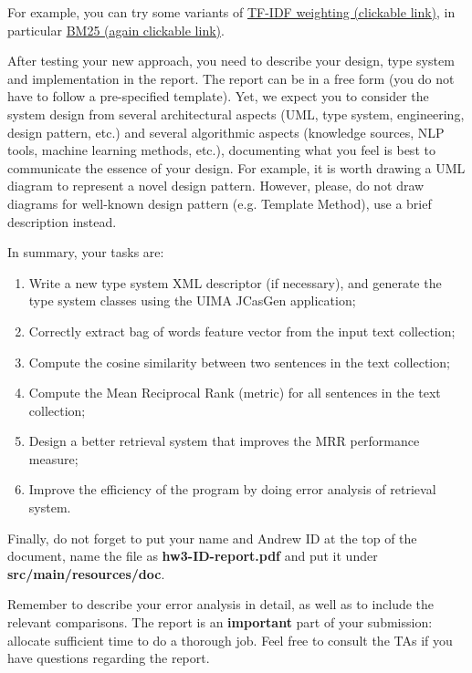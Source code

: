 \documentclass[oneside,11pt]{memoir}
\begin{document}
For example, you can try some variants of \href{http://nlp.stanford.edu/IR-book/html/htmledition/tf-idf-weighting-1.html}{TF-IDF weighting (clickable link)}, in particular \href{http://en.wikipedia.org/wiki/Okapi_BM25}{BM25 (again clickable link)}.

After testing your new approach,
you need to describe your design, type system and implementation in the report.
The report can be in a free form (you do not have to follow a pre-specified template).
Yet, we expect you to consider the system design from several architectural aspects (UML, type
system, engineering, design pattern, etc.) and several algorithmic aspects (knowledge sources, NLP
tools, machine learning methods, etc.), documenting what you feel is best to communicate
the essence of your design. 
For example, it is worth drawing a UML diagram to represent a novel design pattern.
However, please, do not draw diagrams
for well-known design pattern (e.g. Template Method), use a brief description instead.

In summary, your tasks are:
\begin{enumerate}
\item Write a new type system XML descriptor (if necessary),
and generate the type system classes using the UIMA JCasGen application;
\item Correctly extract bag of words feature vector from the input text collection;
\item Compute the cosine similarity between two sentences in the text collection;
\item Compute the Mean Reciprocal Rank (metric) for all sentences in the text collection;
\item Design a better retrieval system that improves the MRR performance measure;
\item Improve the efficiency of the program by doing error analysis of retrieval system.
\end{enumerate}

Finally, do not forget to put
your name and Andrew ID at the top of the document, 
name the file as \textbf{hw3-ID-report.pdf} and put it
under \textbf{src/main/resources/doc}. 

Remember to describe your error analysis in detail, 
as well as to include the relevant comparisons. 
The report is an \textbf{important} part of your submission: 
allocate sufficient time to do a thorough job. 
Feel free to consult the TAs if you have questions regarding the report.

\begingroup
\renewcommand{\cleardoublepage}{}
\renewcommand{\clearpage}{}
\end{document}
